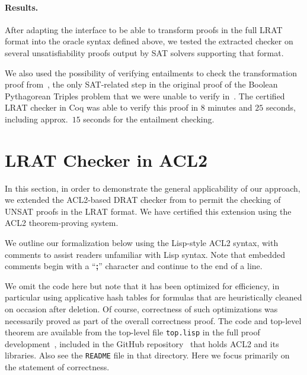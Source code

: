 \documentclass{article}
\begin{document}
\paragraph{Results.}
After adapting the interface to be able to transform proofs in the full LRAT format into the oracle syntax defined
above, we tested the extracted checker on several unsatisfiability proofs output by SAT solvers supporting that format.

We also used the possibility of verifying entailments to check the transformation proof from~\cite{heule-sat16a}, the
only SAT-related step in the original proof of the Boolean Pythagorean Triples problem that we were unable to verify
in~\cite{grit}. The certified LRAT checker in Coq was able to verify this proof in $8$ minutes and $25$ seconds, including
approx.\ $15$ seconds for the entailment checking.
%
%

\section{LRAT Checker in ACL2}
\label{sec:acl2}

In this section, in order to demonstrate the general applicability of our approach,
we extended the ACL2-based DRAT checker from \cite{nathan} to permit the
checking of UNSAT proofs in the LRAT format. We have certified this extension
using the ACL2 theorem-proving system. 
%
%
%
%
%
%
%
%
%
%
%
%
%
%
%
%
%
%
%
%
%
%
%
%
%
%
%
%
%
%
%
%
%
%
%
%
%
%
%
%
%
%
%
%
%
%
%
%
%
%
%
%
%
%
%
%
%
%
%
%
%
%
%
%
%
%
%
%
%
%
%
%
%
%
%
%
%
%
%
%
%
%
%
%
%
%
%
%
%
%
%
%
%
%
%
%
%
%
%
%
%
%
%
%
%
%
%
%
%
%
%
%
%
%
%
%
%
%
%
%
%
%
%
%
%
%
%
%
%
%
%
%
%
%
%

%
We outline our
formalization below using the Lisp-style ACL2 syntax, with comments to
assist readers unfamiliar with Lisp syntax.  Note that embedded
comments begin with a ``{\bf ;}'' character and continue to the end of
a line.

We omit the code here but note that it has been optimized for
efficiency, in particular using applicative hash tables for formulas
that are heuristically cleaned on occasion after deletion.  Of course,
correctness of such optimizations was necessarily proved as part of
the overall correctness proof.  The code and top-level theorem are
available
%
%
%
from the top-level file {\tt top.lisp} in the full proof
development~\cite{acl2-lrat}, included in the GitHub
repository~\cite{acl2-github} that holds ACL2 and its libraries.  Also
see the {\tt README} file in that directory.  Here
we focus primarily on the statement of correctness.
\end{document}

